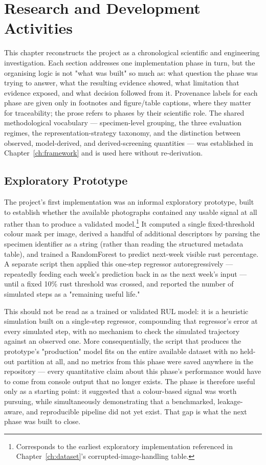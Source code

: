 \chapter{Research and Development Activities}
\label{ch:activities}

This chapter reconstructs the project as a chronological scientific and
engineering investigation. Each section addresses one implementation phase in
turn, but the organising logic is not "what was built" so much as: what
question the phase was trying to answer, what the resulting evidence showed,
what limitation that evidence exposed, and what decision followed from it.
Provenance labels for each phase are given only in footnotes and figure/table
captions, where they matter for traceability; the prose refers to phases by
their scientific role. The shared methodological vocabulary — specimen-level
grouping, the three evaluation regimes, the representation-strategy taxonomy,
and the distinction between observed, model-derived, and derived-screening
quantities — was established in Chapter~\ref{ch:framework} and is used here
without re-derivation.

\section{Exploratory Prototype}
\label{sec:phase0}

The project's first implementation was an informal exploratory prototype,
built to establish whether the available photographs contained any usable
signal at all rather than to produce a validated model.\footnote{Corresponds
to the earliest exploratory implementation referenced in Chapter~\ref{ch:dataset}'s
corrupted-image-handling table.} It computed a single fixed-threshold
colour mask per image, derived a handful of additional descriptors by parsing
the specimen identifier as a string (rather than reading the structured
metadata table), and trained a RandomForest to predict next-week visible rust
percentage. A separate script then applied this one-step regressor
autoregressively — repeatedly feeding each week's prediction back in as the
next week's input — until a fixed 10\% rust threshold was crossed, and
reported the number of simulated steps as a "remaining useful life."

This should not be read as a trained or validated RUL model: it is a
heuristic simulation built on a single-step regressor, compounding that
regressor's error at every simulated step, with no mechanism to check the
simulated trajectory against an observed one. More consequentially, the
script that produces the prototype's "production" model fits on the entire
available dataset with no held-out partition at all, and no metrics from
this phase were saved anywhere in the repository — every quantitative claim
about this phase's performance would have to come from console output that
no longer exists. The phase is therefore useful only as a starting point: it
suggested that a colour-based signal was worth pursuing, while simultaneously
demonstrating that a benchmarked, leakage-aware, and reproducible pipeline
did not yet exist. That gap is what the next phase was built to close.

